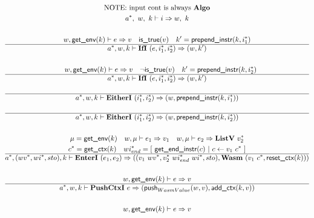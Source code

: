 \begin{gather*}
  \text{NOTE: input cont is always \algo} \\
  \seq{a}, ~ w, ~ k \vdash i \Rightarrow w, ~ k \\
%
\newline \\
  w, \getenv(k) \vdash e \Rightarrow v \quad
  \istrue(v) \quad k' = \prependinstr(k, \seq{i_1}) \\
  \hline
  \seq{a}, w, k \vdash \ifi ~ (e, \seq{i_1}, \seq{i_2}) \Rightarrow (w, k') \\
%
\newline \\
  \quad w, \getenv(k) \vdash e \Rightarrow v \quad
  \neg \istrue(v) \quad k' = \prependinstr(k, \seq{i_2}) \\
  \hline
  \seq{a}, w, k \vdash \ifi ~ (e, \seq{i_1}, \seq{i_2}) \Rightarrow (w, k') \\
%
\newline \\
  \hline
  \seq{a}, w, k \vdash \eitheri ~ (\seq{i_1}, \seq{i_2}) \Rightarrow (w, \prependinstr(k, \seq{i_1})) \\
%
\newline \\
  \hline
  \seq{a}, w, k \vdash \eitheri ~ (\seq{i_1}, \seq{i_2}) \Rightarrow (w, \prependinstr(k, \seq{i_2})) \\
%
\newline \\
  \mu = \getenv(k) \quad
  w, \mu \vdash e_1 \Rightarrow v_1 \quad
  w, \mu \vdash e_2 \Rightarrow \listv ~ \seq{v_2} \\
  \seq c = \getctx(k) \quad
  \seq{wi_{end}} = [ ~ \getendinstr(c) ~ | ~ c \leftarrow v_1 ~ \seq c ~ ] \\
  \hline
  \seq{a}, (\seq{wv}, \seq{wi}, sto), k \vdash \enteri ~ (e_1, e_2)
  \Rightarrow
  ((v_1 ~ \seq{wv}, \seq{v_2} ~ \seq{wi_{end}}~ \seq{wi}, sto), \wasm ~ (v_1 ~ \seq c, \resetctx(k))) \\
%
\newline \\
  w, \getenv(k) \vdash e \Rightarrow v \\
  \hline
  \seq{a}, w, k \vdash \pushctxi ~ e
  \Rightarrow
  (\push_{WasmValue}(w, v), \addctx(k, v)) \\
%
\newline \\
  w, \getenv(k) \vdash e \Rightarrow v \\

\end{gather*}
